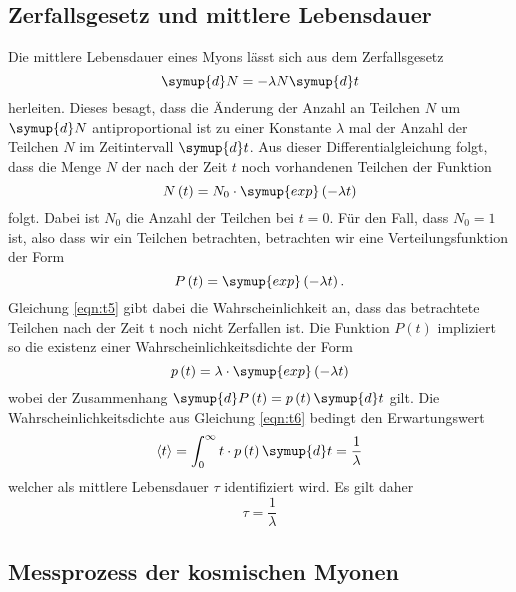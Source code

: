 \subsection{Zerfallsgesetz und mittlere Lebensdauer}
Die mittlere Lebensdauer eines Myons lässt sich aus dem Zerfallsgesetz 
\begin{equation}
    \label{eqn:t3}
    \symup{d}N = - \lambda N \symup{d}t
\end{equation}
herleiten. Dieses besagt, dass die Änderung der Anzahl an Teilchen $N$ um $\symup{d}N$ antiproportional ist zu einer Konstante $\lambda$ mal der Anzahl der Teilchen $N$ im Zeitintervall $\symup{d}t$. Aus dieser Differentialgleichung folgt, dass die Menge $N$ der nach der Zeit $t$ noch vorhandenen Teilchen der Funktion
\begin{equation}
    \label{eqn:t4}
    N\left(t\right) = N_0 \cdot \symup{exp} \left( -\lambda t \right)
\end{equation}
folgt. Dabei ist $N_0$ die Anzahl der Teilchen bei $t = 0$. Für den Fall, dass $N_0 = 1$ ist, also dass wir ein Teilchen betrachten, betrachten wir eine Verteilungsfunktion der Form 
\begin{equation}
    \label{eqn:t5}
    P\left(t\right) = \symup{exp} \left( -\lambda t \right) .
\end{equation}
Gleichung \ref{eqn:t5} gibt dabei die Wahrscheinlichkeit an, dass das betrachtete Teilchen nach der Zeit t noch nicht Zerfallen ist. Die Funktion $P\left(t\right)$ impliziert so die existenz einer Wahrscheinlichkeitsdichte der Form
\begin{equation}
    \label{eqn:t6}
    p\left(t\right) = \lambda \cdot \symup{exp} \left( -\lambda t \right) 
\end{equation}
wobei der Zusammenhang $\symup{d}P\left(t\right) = p \left(t\right) \symup{d}t$ gilt.
Die Wahrscheinlichkeitsdichte aus Gleichung \ref{eqn:t6} bedingt den Erwartungswert
\begin{equation}
    \label{eqn:t7}
    \langle t \rangle  = \int_0^{\infty} t \cdot p\left(t\right) \symup{d}t = \frac{1}{\lambda}
\end{equation}
welcher als mittlere Lebensdauer $\tau$ identifiziert wird. Es gilt daher 
\begin{equation}
    \label{eqn:t8}
    \tau = \frac{1}{\lambda}
\end{equation}
\subsection{Messprozess der kosmischen Myonen}
\newpage


